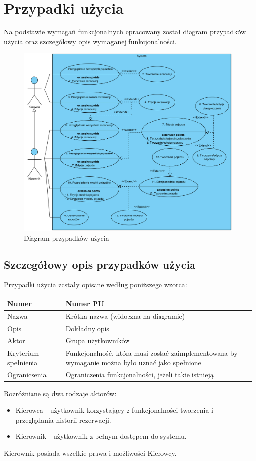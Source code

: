 \documentclass[eng,printmode,openany]{mgr}
\begin{document}
	\section{Przypadki użycia}
	Na podstawie wymagań funkcjonalnych opracowany został diagram przypadków użycia oraz szczegółowy opis wymaganej funkcjonalności.
	\begin{figure}[H]
		\centering
		\includegraphics[width=\textwidth]{images/use_case_1.png}
		\caption{Diagram przypadków użycia}
	\end{figure}
	\subsection{Szczegółowy opis przypadków użycia}
	Przypadki użycia zostały opisane według poniższego wzorca:
	\begin{table}[H]
		\begin{tabularx}{\textwidth}{|l|X|}
			\hline
			Numer                & Numer PU \\ \hline
			Nazwa                & Krótka nazwa (widoczna na diagramie)\\ \hline
			Opis                 & Dokładny opis\\ \hline
			Aktor                & Grupa użytkowników\\ \hline
			Kryterium spełnienia & Funkcjonalność, która musi zostać zaimplementowana by wymaganie można było uznać jako spełnione\\ \hline
			Ograniczenia         & Ograniczenia funkcjonalności, jeżeli takie istnieją\\ \hline
		\end{tabularx}
	\end{table}
	Rozróżniane są dwa rodzaje aktorów:
	\begin{itemize}
		\item Kierowca - użytkownik korzystający z funkcjonalności tworzenia i przeglądania historii rezerwacji.
		\item Kierownik - użytkownik z pełnym dostępem do systemu.
	\end{itemize}
	Kierownik posiada wszelkie prawa i możliwości Kierowcy.
	
\end{document}
